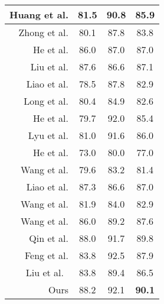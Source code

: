 \begin{table}[!t]
\begin{tabular}{ r  |ccc}
      \hline
      Huang et al. \cite{huang2019mask1} & 81.5 & 90.8 & 85.9 \\
      \hline
      Zhong et al. \cite{zhong2019improved} & 80.1 & 87.8 & 83.8 \\
      \hline
      He et al. \cite{he2018end2} & 86.0 & 87.0 & 87.0 \\
      \hline
      Liu et al. \cite{liu2019arbitrarily} & 87.6 & 86.6 & 87.1 \\
      \hline
      Liao et al. \cite{liao2018textboxes++} & 78.5 & 87.8 & 82.9 \\
      \hline
      Long et al. \cite{long2018textsnake} & 80.4 & 84.9 & 82.6 \\
      \hline
      He et al. \cite{he2020realtime} & 79.7 & 92.0 & 85.4 \\
      \hline
      Lyu et al. \cite{lyu2018mask} & 81.0 & 91.6 & 86.0 \\
      \hline
      He et al. \cite{he2017single} & 73.0 & 80.0 & 77.0 \\
      \hline
      Wang et al. \cite{xie2019convolutional} & 79.6 & 83.2 & 81.4 \\
      \hline
      Liao et al. \cite{liao2019mask} & 87.3 & 86.6 & 87.0 \\
      \hline
      Wang et al. \cite{wang2019efficient} & 81.9 & 84.0 & 82.9 \\
      \hline
      Wang et al. \cite{Wang_2019_CVPR} & 86.0 & 89.2 & 87.6 \\
      \hline
      Qin et al. \cite{qin2019towards} & 88.0 & 91.7 & 89.8 \\
      \hline
      Feng et al. \cite{feng2019textdragon} & 83.8 & 92.5 & 87.9 \\
      \hline\hline
      Liu et al.\  \cite{liu2019omnidirectional} & 83.8 & 89.4 & 86.5 \\
      \hline
Ours & 88.2 & 92.1 & \bf 90.1 \\
      \hline
    \end{tabular}
   \end{table}

